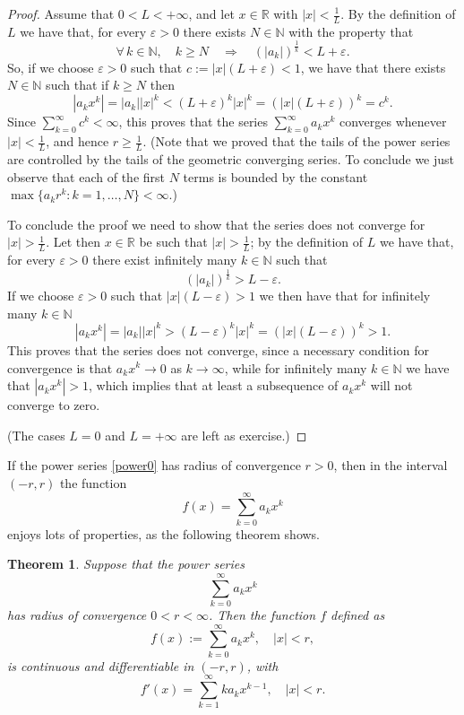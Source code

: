 \documentclass[a4paper,reqno]{amsart}
\numberwithin{equation}{section}
\newtheorem{theorem}[definition]{Theorem}
\def\N{\mathbb{N}}
\def\R{\mathbb{R}}
\begin{document}
\begin{proof}
Assume that $0<L<+\infty$, and let $x\in \R$ with $|x|<\frac1L$. By the definition of $L$ we have that, for every $\varepsilon>0$ there exists $N\in \N$ with the property that
$$
\forall\, k\in \N, \quad  k\geq N \quad \Rightarrow \quad (|a_k|)^{\frac1k} < L+\varepsilon.
$$
So, if we choose $\varepsilon>0$ such that $c:=|x|(L+\varepsilon)<1$, we have that there exists $N\in \N$ such that if $k\geq N$ then
$$
|a_k x^k| = |a_k| |x|^k < (L+\varepsilon)^k |x|^k = (|x|(L+\varepsilon))^k = c^k.
$$
Since $\sum_{k=0}^\infty c^k <\infty$, this proves that the series $\sum_{k=0}^\infty a_k x^k$ converges whenever $|x|< \frac1L$, and hence $r\geq \frac1L$. (Note that we proved that the tails of the power series are controlled by the tails of the
geometric converging series. To conclude we just observe that each of the first $N$ terms is bounded by the constant $\max\{a_k r^k: k=1, \dots, N\} <\infty$.)

To conclude the proof we need to show that the series does not converge for $|x|>\frac1L$. Let then $x\in \R$ be such that $|x|>\frac1L$; by the definition of $L$ we have that, for every $\varepsilon>0$
there exist infinitely many $k\in \N$ such that
$$
(|a_k|)^{\frac1k} > L-\varepsilon.
$$
If we choose $\varepsilon>0$ such that $|x|(L-\varepsilon)> 1$ we then have that for infinitely many $k\in \N$
$$
|a_k x^k| = |a_k| |x|^k > (L-\varepsilon)^k |x|^k = (|x|(L -\varepsilon))^k >1.
$$
This proves that the series does not converge, since a necessary condition for convergence is that $a_k x^k \to 0$ as $k\to \infty$, while for infinitely many $k\in \N$ we have that  $|a_k x^k|>1$, which implies that at least a subsequence of $a_k x^k$ will not converge to zero.
\smallskip

(The cases $L=0$ and $L=+\infty$ are left as exercise.)
\end{proof}

\bigskip

If the power series \eqref{power0} has radius of convergence $r>0$, then in the interval $(-r,r)$ the function
$$
f(x) = \sum_{k=0}^\infty a_k x^k
$$
enjoys lots of properties, as the following theorem shows.



\begin{theorem}\label{power:deriv}
Suppose that the power series
\begin{equation}\label{l:ps}
\sum_{k=0}^\infty a_k x^k
\end{equation}
has radius of convergence $0<r<\infty$. Then the function $f$ defined as
$$
f(x):=\sum_{k=0}^\infty a_k x^k, \quad |x|<r,
$$
is continuous and differentiable in $(-r,r)$, with
$$
f'(x) = \sum_{k=1}^\infty k a_k x^{k-1}, \quad |x|<r.
$$
\end{theorem}
\end{document}
